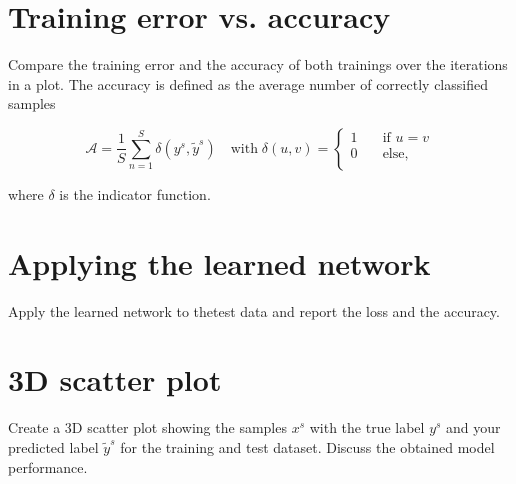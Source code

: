 \documentclass[12pt]{article}         %
\begin{document}
\section{Training error vs. accuracy}
Compare the training error and the accuracy of both trainings over the iterations in a plot.  The accuracy is defined as the average number of correctly classified samples

$$
	\mathcal{A} = \dfrac{1}{S}\sum_{n=1}^{S}\delta(y^s,\tilde y^s) \quad\text{with}\; \delta(u, v) = 
	\left\{
	\begin{aligned}
		1 \quad & \text{if } u = v\\
		0 \quad & \text{else,}\\ 
	 \end{aligned} 
	 \right.
$$

where $\delta$ is the indicator function.

\section{Applying the learned network}
Apply the learned network to thetest data and report the loss and the accuracy.

\section{3D scatter plot}
Create  a  3D  scatter  plot  showing  the  samples $x^s$ with  the  true  label $y^s$ and  your  predicted  label $\tilde y^s$ for  the training and test dataset.  Discuss the obtained model performance.
\end{document}
